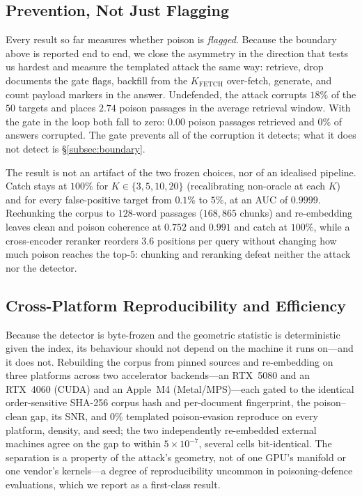 \documentclass[conference]{IEEEtran}
\begin{document}
\subsection{Prevention, Not Just Flagging}
\label{subsec:e2e}
Every result so far measures whether poison is \emph{flagged}. Because the boundary above is
reported end to end, we close the asymmetry in the direction that tests us hardest and measure
the templated attack the same way: retrieve, drop documents the gate flags, backfill from the
$K_{\mathrm{FETCH}}$ over-fetch, generate, and count payload markers in the answer. Undefended,
the attack corrupts $18\%$ of the $50$ targets and places $2.74$ poison passages in the average
retrieval window. With the gate in the loop both fall to zero: $0.00$ poison passages retrieved
and $0\%$ of answers corrupted. The gate prevents all of the corruption it detects; what it does
not detect is \S\ref{subsec:boundary}.

The result is not an artifact of the two frozen choices, nor of an idealised pipeline. Catch
stays at $100\%$ for $K\in\{3,5,10,20\}$ (recalibrating non-oracle at each $K$) and for every
false-positive target from $0.1\%$ to $5\%$, at an AUC of $0.9999$. Rechunking the corpus to
$128$-word passages ($168{,}865$ chunks) and re-embedding leaves clean and poison coherence at
$0.752$ and $0.991$ and catch at $100\%$, while a cross-encoder reranker reorders $3.6$ positions
per query without changing how much poison reaches the top-$5$: chunking and reranking defeat
neither the attack nor the detector.

\subsection{Cross-Platform Reproducibility and Efficiency}
\label{subsec:eff}
Because the detector is byte-frozen and the geometric statistic is deterministic given the
index, its behaviour should not depend on the machine it runs on---and it does not. Rebuilding
the corpus from pinned sources and re-embedding on three platforms across two accelerator
backends---an RTX~5080 and an RTX~4060 (CUDA) and an Apple~M4 (Metal/MPS)---each gated to the
identical order-sensitive SHA-256 corpus hash and per-document fingerprint, the poison--clean
gap, its SNR, and $0\%$ templated poison-evasion reproduce on every platform, density, and seed;
the two independently re-embedded external machines agree on the gap to within $5\times10^{-7}$,
several cells bit-identical. The separation is a property of the attack's
geometry, not of one GPU's manifold or one vendor's kernels---a degree of reproducibility
uncommon in poisoning-defence evaluations, which we report as a first-class result.
\end{document}

